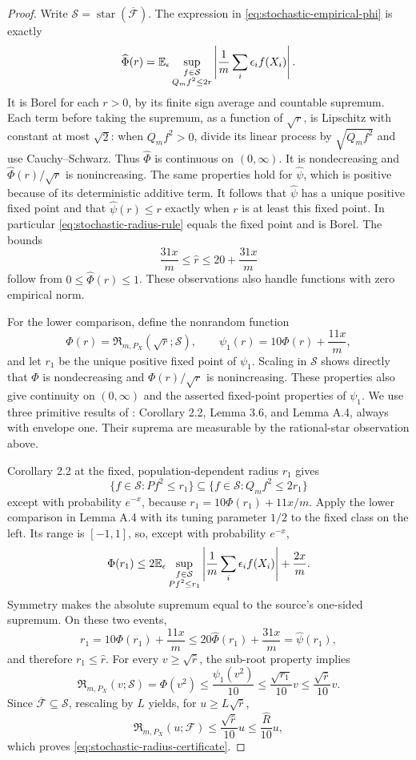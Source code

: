 \begin{proof}
Write $\mathcal S=\operatorname{star}(\overline{\mathcal F})$.
The expression in \eqref{eq:stochastic-empirical-phi} is exactly
\[
 \widehat\Phi(r)
 =\mathbb E_\epsilon\sup_{\substack{f\in\mathcal S\\Q_mf^2\le2r}}
 \left|\frac1m\sum_i\epsilon_if(X_i)\right|.
\]
It is Borel for each $r>0$, by its finite sign average and countable
supremum. Each term before taking the supremum, as a function of
$\sqrt r$, is Lipschitz with constant at most $\sqrt2$: when
$Q_mf^2>0$, divide its linear process by $\sqrt{Q_mf^2}$ and use
Cauchy--Schwarz. Thus $\widehat\Phi$ is continuous on $(0,\infty)$.
It is nondecreasing and $\widehat\Phi(r)/\sqrt r$ is nonincreasing.
The same properties hold for $\widehat\psi$, which is positive
because of its deterministic additive term. It follows that
$\widehat\psi$ has a unique positive fixed point and that
$\widehat\psi(r)\le r$ exactly when $r$ is at least this fixed
point. In particular \eqref{eq:stochastic-radius-rule} equals the
fixed point and is Borel. The bounds
\[
 \frac{31x}{m}\le\widehat r\le20+\frac{31x}{m}
\]
follow from $0\le\widehat\Phi(r)\le1$. These observations also
handle functions with zero empirical norm.

For the lower comparison, define the nonrandom function
\[
 \Phi(r)=\mathfrak R_{m,P_X}(\sqrt r;\mathcal S),\qquad
 \psi_1(r)=10\Phi(r)+\frac{11x}{m},
\]
and let $r_1$ be the unique positive fixed point of $\psi_1$.
Scaling in $\mathcal S$ shows directly that $\Phi$ is nondecreasing
and $\Phi(r)/\sqrt r$ is nonincreasing. These properties also give
continuity on $(0,\infty)$ and the asserted fixed-point properties
of $\psi_1$. We use three primitive results of
\citet{bartlett2005local}: Corollary 2.2, Lemma 3.6, and Lemma A.4,
always with envelope one. Their suprema are measurable by the
rational-star observation above.

Corollary 2.2 at the fixed, population-dependent radius $r_1$ gives
\[
 \{f\in\mathcal S:Pf^2\le r_1\}
 \subseteq\{f\in\mathcal S:Q_mf^2\le2r_1\}
\]
except with probability $e^{-x}$, because
$r_1=10\Phi(r_1)+11x/m$. Apply the lower comparison in Lemma A.4
with its tuning parameter $1/2$ to the fixed class on the left.
Its range is $[-1,1]$, so, except with probability $e^{-x}$,
\[
 \Phi(r_1)
 \le2\mathbb E_\epsilon
 \sup_{\substack{f\in\mathcal S\\Pf^2\le r_1}}
 \left|\frac1m\sum_i\epsilon_if(X_i)\right|+
 \frac{2x}{m}.
\]
Symmetry makes the absolute supremum equal to the source's
one-sided supremum. On these two events,
\[
 r_1=10\Phi(r_1)+\frac{11x}{m}
 \le20\widehat\Phi(r_1)+\frac{31x}{m}
 =\widehat\psi(r_1),
\]
and therefore $r_1\le\widehat r$. For every
$v\ge\sqrt{\widehat r}$, the sub-root property implies
\[
 \mathfrak R_{m,P_X}(v;\mathcal S)
 =\Phi(v^2)\le\frac{\psi_1(v^2)}{10}
 \le\frac{\sqrt{r_1}}{10}v
 \le\frac{\sqrt{\widehat r}}{10}v.
\]
Since $\overline{\mathcal F}\subseteq\mathcal S$, rescaling by
$L$ yields, for $u\ge L\sqrt{\widehat r}$,
\[
 \mathfrak R_{m,P_X}(u;\mathcal F)
 \le\frac{\sqrt{\widehat r}}{10}u
 \le\frac{\widehat R}{10}u,
\]
which proves \eqref{eq:stochastic-radius-certificate}.


\end{proof}

